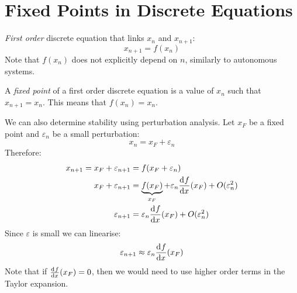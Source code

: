 \documentclass[../main.tex]{subfiles}
\begin{document}
\begin{example}
\begin{center}
  \end{center}
\end{example}
\section{Fixed Points in Discrete Equations}
\textit{First order} discrete equation that links $x_n$ and $x_{n + 1}$:
\[
  x_{n + 1} = f(x_n)
\]
Note that $f(x_n)$ does not explicitly depend on $n$, similarly to autonomous systems.
\begin{definition}
  A \textit{fixed point} of a first order discrete equation is a value of $x_n$ such that $x_{n + 1} = x_n$.
  This means that $f(x_{n}) = x_{n}$.
\end{definition}
We can also determine stability using perturbation analysis.
Let $x_F$ be a fixed point and $\varepsilon_n$ be a small perturbation:
\[
  x_n = x_F + \varepsilon_n
\]
Therefore:
\begin{align*}
  x_{n + 1} = x_F + \varepsilon_{n + 1} &= f(x_F + \varepsilon_n) \\
  x_F + \varepsilon_{n+1} &= \underbrace{f(x_F)}_{x_F} + \varepsilon_n \deriv{f}{x}(x_F) + O(\varepsilon^{2}_{n}) \\
  \varepsilon_{n+1} & =\varepsilon_n \deriv{f}{x}(x_F) + O(\varepsilon^{2}_{n})
\end{align*}
Since $\varepsilon$ is small we can linearise:
\[
  \varepsilon_{n+1} \approx \varepsilon_n \deriv{f}{x}(x_F)
\]
Note that if $\deriv{f}{x}(x_F) = 0$, then we would need to use higher order terms in the Taylor expansion.
\end{document}
